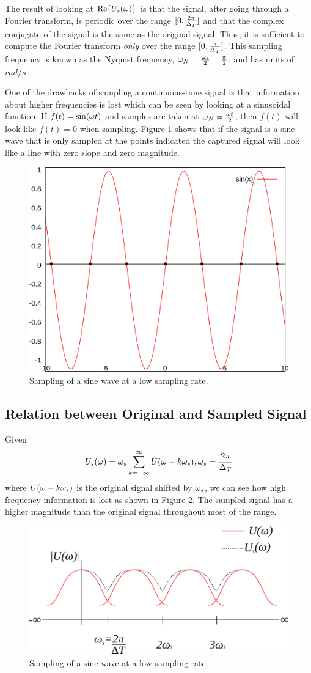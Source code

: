 The result of looking at $\text{Re}\{U_s(\omega)\}$ is that the signal, after going through a Fourier transform, is periodic over the range $[0, \frac{2\pi}{\Delta_T}]$ and that the complex conjugate of the signal is the same as the original signal. Thus, it is sufficient to compute the Fourier transform \textit{only} over the range $[0, \frac{\pi}{\Delta_T}]$. This sampling frequency is known as the Nyquist frequency, $\omega_N = \frac{\omega_s}{2} = \frac{\pi}{2}$, and has units of $rad/s$.

One of the drawbacks of sampling a continuous-time signal is that information about higher frequencies is lost which can be seen by looking at a sinusoidal function. If $f(t) = \sin(\omega t)$ and samples are taken at $\omega_N = \frac{\omega t}{2}$, then $f(t)$ will look like $f(t) = 0$ when sampling. Figure \ref{fig:02lowSampleRate} shows that if the signal is a sine wave that is only sampled at the points indicated the captured signal will look like a line with zero slope and zero magnitude.
\begin{figure}[ht!]
	\centering
	\includegraphics[width=.5\textwidth]{images/02lowSampleRate}
	\caption{Sampling of a sine wave at a low sampling rate.}
	\label{fig:02lowSampleRate}
\end{figure}

\subsection{Relation between Original and Sampled Signal}
Given
$$U_s(\omega) = \omega_s \sum_{k=-\infty}^\infty U(\omega-k\omega_s), \omega_s = \frac{2\pi}{\Delta_T}$$
where $U(\omega-k\omega_s)$ is the original signal shifted by $\omega_s$, we can see how high frequency information is lost as shown in Figure \ref{fig:02freqResp}. The sampled signal has a higher magnitude than the original signal throughout most of the range.
\begin{figure}[ht!]
	\centering
	\includegraphics[width=.5\textwidth]{images/02freqResp}
	\caption{Sampling of a sine wave at a low sampling rate.}
	\label{fig:02freqResp}
\end{figure}

